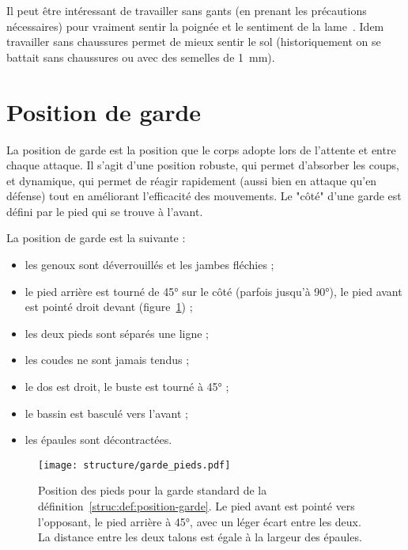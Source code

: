 Il peut être intéressant de travailler sans gants (en prenant les précautions nécessaires) pour vraiment sentir la poignée et le sentiment de la lame~\cite{enzi:dijon:messer_inner:2015}.
Idem travailler sans chaussures permet de mieux sentir le sol (historiquement on se battait sans chaussures ou avec des semelles de \SI{1}{mm}).


\section{Position de garde}


La position de garde est la position que le corps adopte lors de l'attente et entre chaque attaque.
Il s'agit d'une position robuste, qui permet d'absorber les coups, et dynamique, qui permet de réagir rapidement (aussi bien en attaque qu'en défense) tout en améliorant l'efficacité des mouvements.
Le "côté" d'une garde est défini par le pied qui se trouve à l'avant.


\begin{definition}
\label{struc:def:position-garde}

La position de garde est la suivante :
\begin{itemize}
	\item les genoux sont déverrouillés et les jambes fléchies ;
	\item le pied arrière est tourné de 45° sur le côté (parfois jusqu'à 90°), le pied avant est pointé droit devant (figure~\ref{struc:fig:garde-pieds}) ;
	\item les deux pieds sont séparés une ligne ;
	\item les coudes ne sont jamais tendus ;
	\item le dos est droit, le buste est tourné à 45° ;
	\item le bassin est basculé vers l'avant ;
	\item les épaules sont décontractées.
\end{itemize}
\end{definition}


\begin{figure}[ht]
	\centering
	\texttt{[image: structure/garde\_pieds.pdf]}
	\caption{Position des pieds pour la garde standard de la définition~\ref{struc:def:position-garde}.
	Le pied avant est pointé vers l'opposant, le pied arrière à 45°, avec un léger écart entre les deux.
	La distance entre les deux talons est égale à la largeur des épaules.}
	\label{struc:fig:garde-pieds}
\end{figure}


